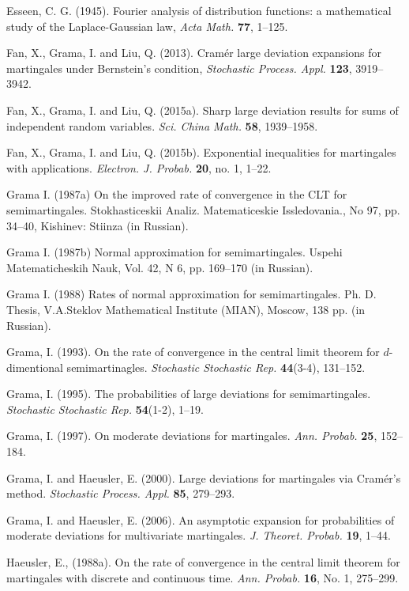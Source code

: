 \documentclass{gSTA2e}
\theoremstyle{plain}
\theoremstyle{definition}
\theoremstyle{remark}
\begin{document}
\begin{thebibliography}{99}
 Esseen, C. G. (1945).  Fourier analysis of distribution functions: a mathematical study of the
Laplace-Gaussian law, \emph{Acta Math.} \textbf{77}, 1--125.

 Fan, X., Grama, I. and Liu, Q. (2013). Cram\'{e}r large deviation expansions for martingales under Bernstein's condition, \emph{Stochastic Process. Appl.} \textbf{123}, 3919--3942.


 Fan, X., Grama, I. and Liu, Q. (2015a). Sharp large deviation results for sums of independent random variables. \emph{Sci. China Math.} \textbf{58},  1939--1958.

 Fan, X., Grama, I. and Liu, Q. (2015b). Exponential inequalities for martingales with applications. \emph{Electron. J. Probab.} \textbf{20},  no. 1, 1--22.


 Grama I. (1987a) On the improved rate of convergence in the CLT for semimartingales. Stokhasticeskii Analiz. Matematiceskie Issledovania., No 97, pp. 34--40, Kishinev: Stiinza (in Russian).

 Grama I. (1987b) Normal approximation for semimartingales. Uspehi Matematicheskih Nauk, Vol. 42, N 6, pp. 169--170 (in Russian).

 Grama I. (1988) Rates of normal approximation for semimartingales. Ph. D. Thesis, V.A.Steklov Mathematical Institute (MIAN), Moscow, 138 pp. (in Russian).

  Grama, I. (1993). On the rate of convergence in the central limit theorem for $d$-dimentional semimartinagles.   \emph{Stochastic Stochastic Rep.} \textbf{44}(3-4), 131--152.

  Grama, I. (1995). The probabilities of large deviations for semimartingales. \emph{Stochastic Stochastic Rep.}
\textbf{54}(1-2), 1--19.

 Grama, I. (1997). On moderate deviations for
martingales. \emph{Ann. Probab.} \textbf{25}, 152--184.

 Grama, I. and Haeusler, E. (2000). Large deviations
for martingales via Cram\'{e}r's method. \emph{Stochastic Process. Appl.} \textbf{85}, 279--293.

  Grama, I. and Haeusler, E. (2006). An asymptotic expansion for
probabilities of moderate deviations for multivariate martingales. \emph{J.  Theoret. Probab.} \textbf{19}, 1--44.



 Haeusler, E., (1988a). On the rate of convergence in the central limit theorem for martingales with discrete and continuous time. \emph{Ann. Probab.} \textbf{16}, No. 1, 275--299.


\end{thebibliography}
\end{document}
